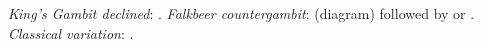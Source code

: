 \emph{King's Gambit declined}: .
\emph{Falkbeer countergambit}:  (diagram) followed by  or .
\emph{Classical variation}: .
